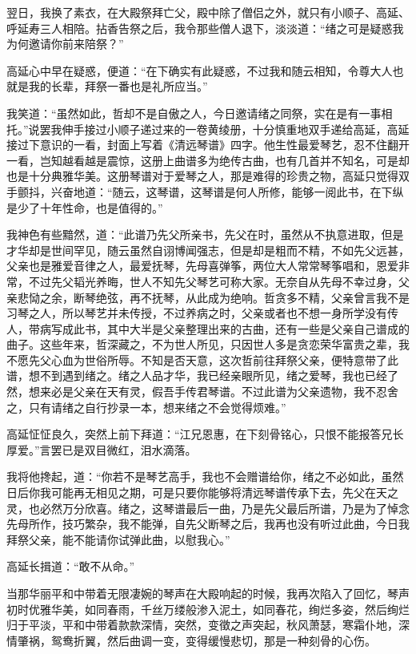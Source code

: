 翌日，我换了素衣，在大殿祭拜亡父，殿中除了僧侣之外，就只有小顺子、高延、呼延寿三人相陪。拈香告祭之后，我令那些僧人退下，淡淡道：“绪之可是疑惑我为何邀请你前来陪祭？”

高延心中早在疑惑，便道：“在下确实有此疑惑，不过我和随云相知，令尊大人也就是我的长辈，拜祭一番也是礼所应当。”

我笑道：“虽然如此，哲却不是自傲之人，今日邀请绪之同祭，实在是有一事相托。”说罢我伸手接过小顺子递过来的一卷黄绫册，十分慎重地双手递给高延，高延接过下意识的一看，封面上写着《清远琴谱》四字。他生性最爱琴艺，忍不住翻开一看，岂知越看越是震惊，这册上曲谱多为绝传古曲，也有几首并不知名，可是却也是十分典雅华美。这册琴谱对于爱琴之人，那是难得的珍贵之物，高延只觉得双手颤抖，兴奋地道：“随云，这琴谱，这琴谱是何人所修，能够一阅此书，在下纵是少了十年性命，也是值得的。”

我神色有些黯然，道：“此谱乃先父所亲书，先父在时，虽然从不执意进取，但是才华却是世间罕见，随云虽然自诩博闻强志，但是却是粗而不精，不如先父远甚，父亲也是雅爱音律之人，最爱抚琴，先母喜弹筝，两位大人常常琴筝唱和，恩爱非常，不过先父韬光养晦，世人不知先父琴艺可称大家。无奈自从先母不幸过身，父亲悲恸之余，断琴绝弦，再不抚琴，从此成为绝响。哲贪多不精，父亲曾言我不是习琴之人，所以琴艺并未传授，不过养病之时，父亲或者也不想一身所学没有传人，带病写成此书，其中大半是父亲整理出来的古曲，还有一些是父亲自己谱成的曲子。这些年来，哲深藏之，不为世人所见，只因世人多是贪恋荣华富贵之辈，我不愿先父心血为世俗所辱。不知是否天意，这次哲前往拜祭父亲，便特意带了此谱，想不到遇到绪之。绪之人品才华，我已经亲眼所见，绪之爱琴，我也已经了然，想来必是父亲在天有灵，假吾手传君琴谱。不过此谱为父亲遗物，我不忍舍之，只有请绪之自行抄录一本，想来绪之不会觉得烦难。”

高延怔怔良久，突然上前下拜道：“江兄恩惠，在下刻骨铭心，只恨不能报答兄长厚爱。”言罢已是双目微红，泪水滴落。

我将他搀起，道：“你若不是琴艺高手，我也不会赠谱给你，绪之不必如此，虽然日后你我可能再无相见之期，可是只要你能够将清远琴谱传承下去，先父在天之灵，也必然万分欣喜。绪之，这琴谱最后一曲，乃是先父最后所谱，乃是为了悼念先母所作，技巧繁杂，我不能弹，自先父断琴之后，我再也没有听过此曲，今日我拜祭父亲，能不能请你试弹此曲，以慰我心。”

高延长揖道：“敢不从命。”

当那华丽平和中带着无限凄婉的琴声在大殿响起的时候，我再次陷入了回忆，琴声初时优雅华美，如同春雨，千丝万缕般渗入泥土，如同春花，绚烂多姿，然后绚烂归于平淡，平和中带着款款深情，突然，变徵之声突起，秋风萧瑟，寒霜仆地，深情肇祸，鸳鸯折翼，然后曲调一变，变得缓慢悲切，那是一种刻骨的心伤。

